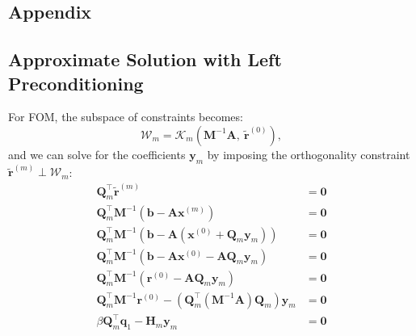 \documentclass{article}
\begin{document}
\begin{appendix}
    \section{Appendix}
    \subsection{Approximate Solution with Left Preconditioning}\label{app:sol-left-precond}
    For FOM, the subspace of constraints becomes:
    \begin{equation*}
        \mathcal{W}_m = \mathcal{K}_m\left( \symbf{M}^{-1} \symbf{A},\: \tilde{\symbf{r}}^{\left( 0 \right)} \right),
    \end{equation*}
    and we can solve for the coefficients \(\symbf{y}_m\) by imposing the
    orthogonality constraint \(\tilde{\symbf{r}}^{\left( m \right)} \perp \mathcal{W}_m\):
    \begin{align*}
        \symbf{Q}_m^\top \tilde{\symbf{r}}^{\left( m \right)}                                                                                                          & = \symbf{0}                           \\
        \symbf{Q}_m^\top \symbf{M}^{-1} \left( \symbf{b} - \symbf{A} \symbf{x}^{\left( m \right)} \right)                                                              & = \symbf{0}                           \\
        \symbf{Q}_m^\top \symbf{M}^{-1} \left( \symbf{b} - \symbf{A} \left( \symbf{x}^{\left( 0 \right)} + \symbf{Q}_m \symbf{y}_m \right) \right)                     & = \symbf{0}                           \\
        \symbf{Q}_m^\top \symbf{M}^{-1} \left( \symbf{b} - \symbf{A} \symbf{x}^{\left( 0 \right)} - \symbf{A} \symbf{Q}_m \symbf{y}_m \right)                          & = \symbf{0}                           \\
        \symbf{Q}_m^\top \symbf{M}^{-1} \left( \symbf{r}^{\left( 0 \right)} - \symbf{A} \symbf{Q}_m \symbf{y}_m \right)                                                & = \symbf{0}                           \\
        \symbf{Q}_m^\top \symbf{M}^{-1} \symbf{r}^{\left( 0 \right)} - \left( \symbf{Q}_m^\top \left( \symbf{M}^{-1} \symbf{A} \right) \symbf{Q}_m \right) \symbf{y}_m & = \symbf{0}                           \\
        \beta \symbf{Q}_m^\top \symbf{q}_1 - \symbf{H}_m \symbf{y}_m                                                                                                   & = \symbf{0}                           \\

\end{align*}
\end{appendix}
\end{document}
